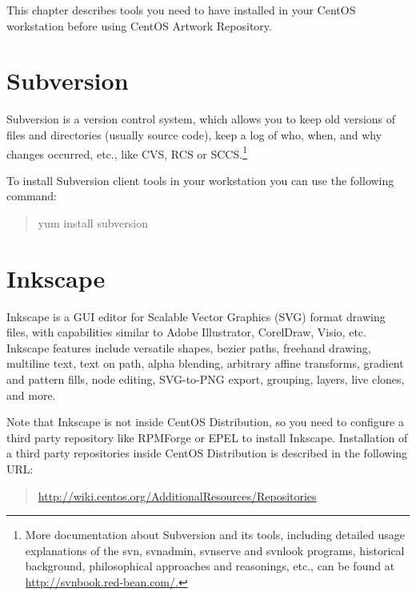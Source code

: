 
This chapter describes tools you need to have installed in your CentOS
workstation before using CentOS Artwork Repository.

\section{Subversion}

Subversion is a version control system, which allows you to keep old
versions of files and directories (usually source code), keep a log of
who, when, and why changes occurred, etc., like CVS, RCS or
SCCS.\footnote{More documentation about Subversion and its tools,
including detailed usage explanations of the svn, svnadmin, svnserve
and svnlook programs, historical background, philosophical approaches
and reasonings, etc., can be found at
\url{http://svnbook.red-bean.com/.}} 

To install Subversion client tools in your workstation you can use the
following command:

\begin{quote}
yum install subversion
\end{quote}

\section{Inkscape}

Inkscape is a GUI editor for Scalable Vector Graphics (SVG) format
drawing files, with capabilities similar to Adobe Illustrator,
CorelDraw, Visio, etc. Inkscape features include versatile shapes,
bezier paths, freehand drawing, multiline text, text on path, alpha
blending, arbitrary affine transforms, gradient and pattern fills,
node editing, SVG-to-PNG export, grouping, layers, live clones, and
more.

Note that Inkscape is not inside CentOS Distribution, so you need to
configure a third party repository like RPMForge or EPEL to install
Inkscape.  Installation of a third party repositories inside CentOS
Distribution is described in the following URL:

\begin{quote}
\url{http://wiki.centos.org/AdditionalResources/Repositories}
\end{quote}


